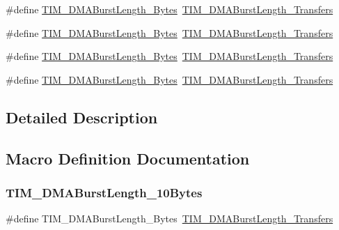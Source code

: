 \begin{DoxyCompactItemize}
\item 
\#define \mbox{\hyperlink{group___t_i_m___legacy_ga3ca90d9fa3c80590175ba42baac57098}{T\+I\+M\+\_\+\+D\+M\+A\+Burst\+Length\+\_\+Bytes}}~\mbox{\hyperlink{group___t_i_m___d_m_a___burst___length_gad13373f5fd246557a4fc487dc43c37ec}{T\+I\+M\+\_\+\+D\+M\+A\+Burst\+Length\+\_\+Transfers}}
\item 
\#define \mbox{\hyperlink{group___t_i_m___legacy_ga672117a7dafcd778fe8e86db423b07e9}{T\+I\+M\+\_\+\+D\+M\+A\+Burst\+Length\+\_\+Bytes}}~\mbox{\hyperlink{group___t_i_m___d_m_a___burst___length_gafb644e6033f7b46c602b02754b69fde0}{T\+I\+M\+\_\+\+D\+M\+A\+Burst\+Length\+\_\+Transfers}}
\item 
\#define \mbox{\hyperlink{group___t_i_m___legacy_gacffd0dc1f04aa06624a4980dcae6eede}{T\+I\+M\+\_\+\+D\+M\+A\+Burst\+Length\+\_\+Bytes}}~\mbox{\hyperlink{group___t_i_m___d_m_a___burst___length_ga5b2c97f650a3c1726965187d852b8cc5}{T\+I\+M\+\_\+\+D\+M\+A\+Burst\+Length\+\_\+Transfers}}
\item 
\#define \mbox{\hyperlink{group___t_i_m___legacy_ga9c4d457417b1ba72ed0ae9886a75547a}{T\+I\+M\+\_\+\+D\+M\+A\+Burst\+Length\+\_\+Bytes}}~\mbox{\hyperlink{group___t_i_m___d_m_a___burst___length_gaed9f2afef174079f6eb6927abd995b9b}{T\+I\+M\+\_\+\+D\+M\+A\+Burst\+Length\+\_\+Transfers}}
\end{DoxyCompactItemize}


\subsection{Detailed Description}


\subsection{Macro Definition Documentation}
\mbox{\label{group___t_i_m___legacy_ga99141ca3210700d07d098d161b42cdf3}} 
\subsubsection{\texorpdfstring{TIM\_DMABurstLength\_10Bytes}{TIM\_DMABurstLength\_10Bytes}}
{\footnotesize\ttfamily \#define T\+I\+M\+\_\+\+D\+M\+A\+Burst\+Length\+\_\+Bytes~\mbox{\hyperlink{group___t_i_m___d_m_a___burst___length_ga2fc09f2148cf6ebddc8e67116212259c}{T\+I\+M\+\_\+\+D\+M\+A\+Burst\+Length\+\_\+Transfers}}}

